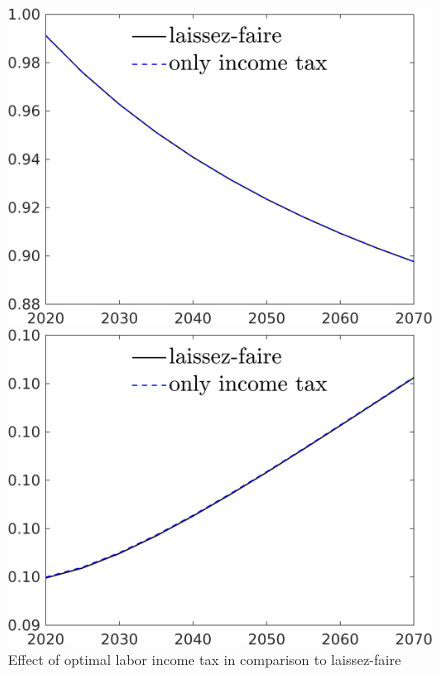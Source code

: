 \begin{figure}[h!!]
	\centering
	\caption{Effect of optimal labor income tax in comparison to laissez-faire }\label{fig:LF_vs_onlytaul}
	\begin{minipage}[]{0.32\textwidth}
		\includegraphics[width=1\textwidth]{../../codding_model/own_basedOnFried/optimalPol_190722_tidiedUp/figures/all_10Aout22/CountTaul_modtest_target_S_spillover0_sep1_extern0_PV1_etaa0.79_lgd1.png}
	\end{minipage}
	\begin{minipage}[]{0.32\textwidth}
		\includegraphics[width=1\textwidth]{../../codding_model/own_basedOnFried/optimalPol_190722_tidiedUp/figures/all_10Aout22/CountTaul_modtest_target_sff_spillover0_sep1_extern0_PV1_etaa0.79_lgd1.png}

\end{minipage}
\end{figure}
